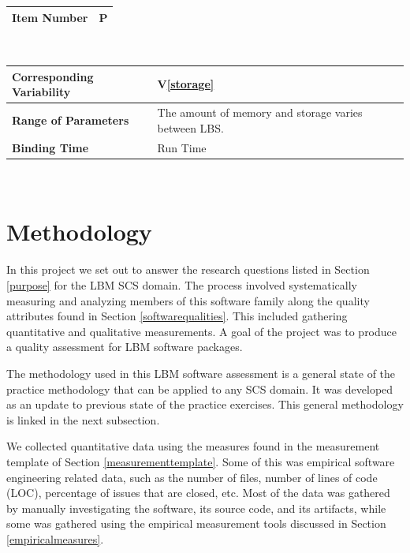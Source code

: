 \documentclass[12pt, notitlepage]{article}
\newcommand{\colEwidth}{0.33\textwidth}
\newcommand{\colFwidth}{0.67\textwidth}
\newcommand{\vref}[1]{V\ref{#1}}
\newcounter{parnum} %
\begin{document}
\begin{minipage}{\textwidth}
	\renewcommand*{\arraystretch}{1.5}
	\begin{tabular}{| p{\colEwidth} | p{\colFwidth}|}
		\hline
		\bf Item Number& P{parnum}\theparnum\label{parstorageconst} \\
		\hline
	\end{tabular}\\
	
	\begin{tabular}{| p{\colEwidth} | p{\colFwidth}|}		
		\hline
		\bf Corresponding Variability & \vref{storage}\\
		\hline
		\bf Range of Parameters & The amount of memory and storage varies between LBS.\\
		\hline
		\bf Binding Time & Run Time\\
		\hline
	\end{tabular}
\end{minipage}\\

\newpage
\section{Methodology}

In this project we set out to answer the research questions listed in Section \ref{purpose} for the LBM SCS domain. The process involved systematically measuring and analyzing members of this software family along the quality attributes found in Section \ref{softwarequalities}. This included gathering quantitative and qualitative measurements. A goal of the project was to produce a quality assessment for LBM software packages.  

The methodology used in this LBM software assessment is a general state of the practice methodology that can be applied to any SCS domain. It was developed as an update to previous state of the practice exercises. This general methodology is linked in the next subsection.

We collected quantitative data using the measures found in the measurement template of Section \ref{measurementtemplate}. Some of this was empirical software engineering related data, such as the number of files, number of lines of code (LOC), percentage of issues that are closed, etc. Most of the data was gathered by manually investigating the software, its source code, and its artifacts, while some was gathered using the empirical measurement tools discussed in Section \ref{empiricalmeasures}.
\end{document}
